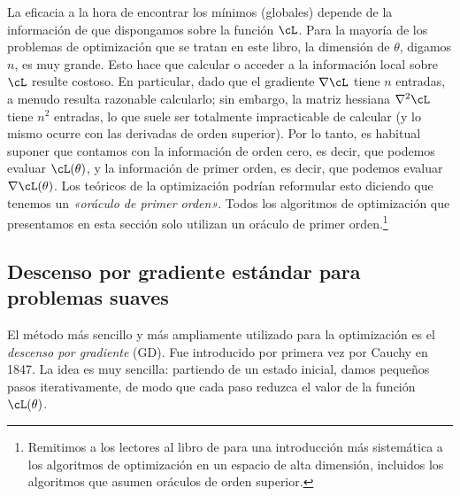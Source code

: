 \documentclass[../../book-main_es.tex]{subfiles}
\begin{document}
La eficacia a la hora de encontrar los mínimos (globales) depende de la
información de que dispongamos sobre la función \(\cL\). Para la mayoría de los
problemas de optimización que se tratan en este libro, la dimensión de \(\theta\),
digamos \(n\), es muy grande. Esto hace que calcular o acceder a la información
local sobre \(\cL\) resulte costoso. En particular, dado que el
gradiente \(\nabla \cL\) tiene \(n\) entradas, a menudo resulta razonable
calcularlo; sin embargo, la matriz hessiana \(\nabla^{2} \cL\) tiene \(n^{2}\)
entradas, lo que suele ser totalmente impracticable de calcular (y lo mismo
ocurre con las derivadas de orden superior). Por lo tanto, es habitual suponer
que contamos con la información de orden cero, es decir, que podemos
evaluar \(\cL(\theta)\), y la información de primer orden, es decir, que
podemos evaluar \(\nabla \cL(\theta)\). Los teóricos de la optimización
podrían reformular esto diciendo que tenemos un \textit{«oráculo de primer orden»}. 
Todos los algoritmos de optimización que presentamos en
esta sección solo utilizan un oráculo de primer orden.\footnote{Remitimos a los
    lectores al libro de \cite{Wright-Ma-2022} para una introducción más sistemática
    a los algoritmos de optimización en un espacio de alta dimensión,
incluidos los algoritmos que asumen oráculos de orden superior.}

\subsection{Descenso por gradiente estándar para problemas suaves}

El método más sencillo y más ampliamente utilizado para la optimización es
el \textit{descenso por gradiente} (GD). Fue introducido por primera vez por Cauchy en
1847. La idea es muy sencilla: partiendo de un estado inicial,
damos pequeños pasos iterativamente, de modo que cada paso reduzca el valor de
la función \(\cL(\theta)\).
\end{document}
